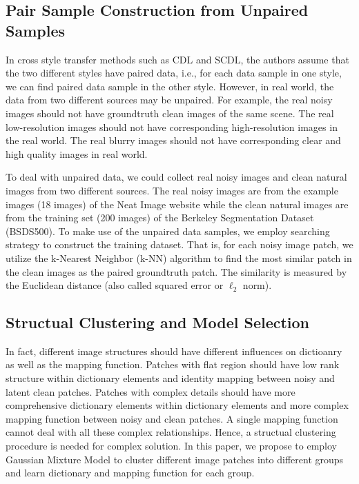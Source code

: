 \documentclass[10pt,twocolumn,letterpaper]{article}
\begin{document}
\subsection{Pair Sample Construction from Unpaired Samples}
In cross style transfer methods such as CDL and SCDL, the authors assume that the two different styles have paired data, i.e., for each data sample in one style, we can find paired data sample in the other style. However, in real world, the data from two different sources may be unpaired. For example, the real noisy images should not have groundtruth clean images of the same scene. The real low-resolution images should not have corresponding high-resolution images in the real world. The real blurry images should not have corresponding clear and high quality images in real world.

To deal with unpaired data, we could collect real noisy images and clean natural images from two different sources. The real noisy images are from the example images (18 images) of the Neat Image website while the clean natural images are from the training set (200 images) of the Berkeley Segmentation Dataset (BSDS500). To make use of the unpaired data samples, we employ searching strategy to construct the training dataset. That is, for each noisy image patch, we utilize the k-Nearest Neighbor (k-NN) algorithm to find the most similar patch in the clean images as the paired groundtruth patch. The similarity is measured by the Euclidean distance (also called squared error or $\ell_{2}$ norm).

\subsection{Structual Clustering and Model Selection}
In fact, different image structures should have different influences on dictioanry as well as the mapping function. Patches with flat region should have low rank structure within dictionary elements and identity mapping between noisy and latent clean patches. Patches with complex details should have more comprehensive dictionary elements within dictionary elements and more complex mapping function between noisy and clean patches. A single mapping function cannot deal with all these complex relationships. Hence, a structual clustering procedure is needed for complex solution. In this paper, we propose to employ Gaussian Mixture Model to cluster different image patches into different groups and learn dictionary and mapping function for each group.
\end{document}
